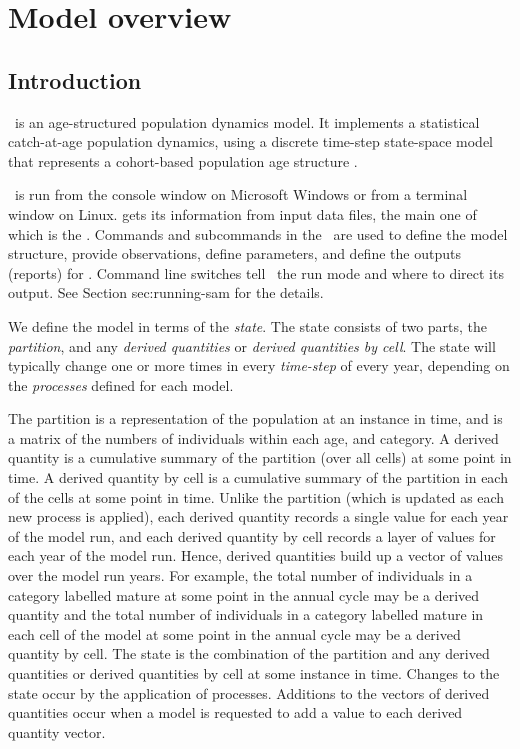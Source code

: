 \section{Model overview\label{sec:overview}}

\subsection{Introduction}
\CNAME\ is an age-structured population dynamics model. It implements a statistical catch-at-age population dynamics, using a discrete time-step state-space model that represents a cohort-based population age structure . 

\CNAME\ is run from the console window on Microsoft Windows or from a terminal window on Linux. \CNAME gets its information from input data files, the main one of which is the \emph{\config}. Commands and subcommands in the \config\ are used to define the model structure, provide observations, define parameters, and define the outputs (reports) for \CNAME. Command line switches tell \CNAME\ the run mode and where to direct its output. See Section sec:running-sam for the details.

 We define the model in terms of the \emph{state}. The state consists of two parts, the \emph{partition}, and any \emph{derived quantities} or \emph{derived quantities by cell}. The state will typically change one or more times in every \emph{time-step} of every year, depending on the \emph{processes} defined for each model. 

The partition is a representation of the population at an instance in time, and is a matrix of the numbers of individuals within each age, and category. A derived quantity is a cumulative summary of the partition (over all cells) at some point in time. A derived quantity by cell is a cumulative summary of the partition in each of the cells at some point in time. Unlike the partition (which is updated as each new process is applied), each derived quantity records a single value for each year of the model run, and each derived quantity by cell records a layer of values for each year of the model run. Hence, derived quantities build up a vector of values over the model run years. For example, the total number of individuals in a category labelled mature at some point in the annual cycle may be a derived quantity and the total number of individuals in a category labelled mature in each cell of the model at some point in the annual cycle may be a derived quantity by cell. The state is the combination of the partition and any derived quantities or derived quantities by cell at some instance in time. Changes to the state occur by the application of processes. Additions to the vectors of derived quantities occur when a model is requested to add a value to each derived quantity vector. 

